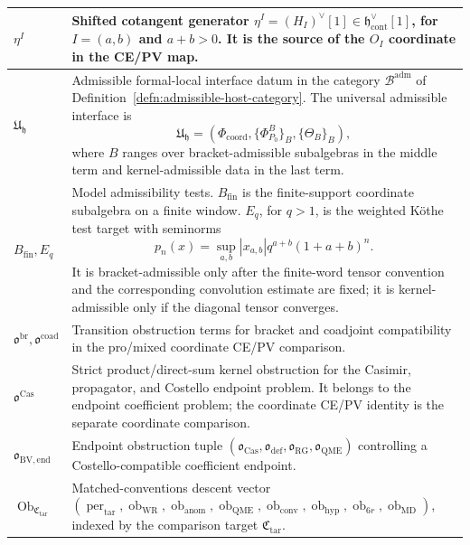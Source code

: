 \begin{longtable}{@{}>{\raggedright\arraybackslash}p{}
  >{\raggedright\arraybackslash}p{}@{}}
\hline
\(\eta^I\) &
Shifted cotangent generator
\(\eta^I=(H_I)^\vee[1]\in\mathfrak h^\vee_{\mathrm{cont}}[1]\), for
\(I=(a,b)\) and \(a+b>0\).  It is the source of the \(O_I\) coordinate in
the CE/PV map.\\
\hline
\(\mathfrak U_{\mathfrak h}\) &
Admissible formal-local interface datum in the category
\(\mathcal B^{\mathrm{adm}}\) of
Definition~\ref{defn:admissible-host-category}.  The universal
admissible interface is
\[
  \mathfrak U_{\mathfrak h}
  =(\Phi_{\mathrm{coord}},\{\Phi^B_{P_0}\}_B,\{\Theta_B\}_B),
\]
where \(B\) ranges over bracket-admissible subalgebras in the middle term
and kernel-admissible data in the last term.\\
\hline
\(B_{\mathrm{fin}},E_q\) &
Model admissibility tests.  \(B_{\mathrm{fin}}\) is the finite-support
coordinate subalgebra on a finite window.  \(E_q\), for \(q>1\), is the
weighted Köthe test target with seminorms
\[
  p_n(x)=\sup_{a,b}|x_{a,b}|q^{a+b}(1+a+b)^n .
\]
It is bracket-admissible only after the finite-word tensor convention
and the corresponding convolution estimate are fixed; it is
kernel-admissible only if the diagonal tensor converges.\\
\hline
\(\mathfrak o^{\mathrm{br}},
  \mathfrak o^{\mathrm{coad}}\) &
Transition obstruction terms for bracket and coadjoint compatibility in
the pro/mixed coordinate CE/PV comparison.\\
\hline
\(\mathfrak o^{\mathrm{Cas}}\) &
Strict product/direct-sum kernel obstruction for the Casimir,
propagator, and Costello endpoint problem.  It belongs to the endpoint
coefficient problem; the coordinate CE/PV identity is the separate
coordinate comparison.\\
\hline
\(\mathfrak o_{\mathrm{BV,end}}\) &
Endpoint obstruction tuple
\((\mathfrak o_{\mathrm{Cas}},
  \mathfrak o_{\mathrm{def}},
  \mathfrak o_{\mathrm{RG}},
  \mathfrak o_{\mathrm{QME}})\) controlling a Costello-compatible
coefficient endpoint.\\
\hline
\(\operatorname{Ob}_{\mathfrak C_{\mathrm{tar}}}\) &
Matched-conventions descent vector
\((\operatorname{per}_{\mathrm{tar}},
  \operatorname{ob}_{\mathrm{WR}},
  \operatorname{ob}_{\mathrm{anom}},
  \operatorname{ob}_{\mathrm{QME}},
  \operatorname{ob}_{\mathrm{conv}},
  \operatorname{ob}_{\mathrm{hyp}},
  \operatorname{ob}_{6r},
  \operatorname{ob}_{\mathrm{MD}})\),
indexed by the comparison target \(\mathfrak C_{\mathrm{tar}}\).\\
\hline
\end{longtable}

